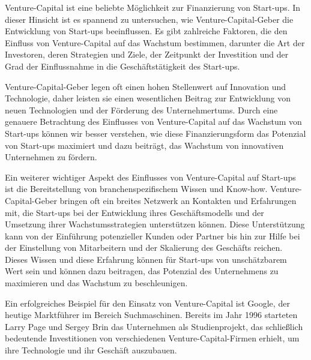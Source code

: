 \begin{refsection}
  
Venture-Capital ist eine beliebte Möglichkeit zur Finanzierung von Start-ups. In dieser Hinsicht ist es spannend zu untersuchen, wie Venture-Capital-Geber die Entwicklung von Start-ups beeinflussen. Es gibt zahlreiche Faktoren, die den Einfluss von Venture-Capital auf das Wachstum bestimmen, darunter die Art der Investoren, deren Strategien und Ziele, der Zeitpunkt der Investition und der Grad der Einflussnahme in die Geschäftstätigkeit des Start-ups.

Venture-Capital-Geber legen oft einen hohen Stellenwert auf Innovation und Technologie, daher leisten sie einen wesentlichen Beitrag zur Entwicklung von neuen Technologien und der Förderung des Unternehmertums. Durch eine genauere Betrachtung des Einflusses von Venture-Capital auf das Wachstum von Start-ups können wir besser verstehen, wie diese Finanzierungsform das Potenzial von Start-ups maximiert und dazu beiträgt, das Wachstum von innovativen Unternehmen zu fördern.

Ein weiterer wichtiger Aspekt des Einflusses von Venture-Capital auf Start-ups ist die Bereitstellung von branchenspezifischem Wissen und Know-how. Venture-Capital-Geber bringen oft ein breites Netzwerk an Kontakten und Erfahrungen mit, die Start-ups bei der Entwicklung ihres Geschäftsmodells und der Umsetzung ihrer Wachstumsstrategien unterstützen können. Diese Unterstützung kann von der Einführung potenzieller Kunden oder Partner bis hin zur Hilfe bei der Einstellung von Mitarbeitern und der Skalierung des Geschäfts reichen. Dieses Wissen und diese Erfahrung können für Start-ups von unschätzbarem Wert sein und können dazu beitragen, das Potenzial des Unternehmens zu maximieren und das Wachstum zu beschleunigen.

Ein erfolgreiches Beispiel für den Einsatz von Venture-Capital ist Google, der heutige Marktführer im Bereich Suchmaschinen. Bereits im Jahr 1996 starteten Larry Page und Sergey Brin das Unternehmen als Studienprojekt, das schlie\ss{}lich bedeutende Investitionen von verschiedenen Venture-Capital-Firmen erhielt, um ihre Technologie und ihr Geschäft auszubauen. \autocite{Gerginov2020}

  \clearpage
  \printbibliography[heading=subsubbibliography]
\end{refsection}
\clearpage
